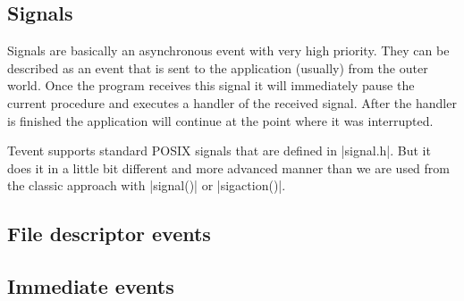 \subsection{Signals}

Signals are basically an asynchronous event with very high priority. They can be
described as an event that is sent to the application (usually) from the outer
world. Once the program receives this signal it will immediately pause the
current procedure and executes a handler of the received signal. After the
handler is finished the application will continue at the point where it was
interrupted.

Tevent supports standard POSIX signals that are defined in |signal.h|. But it
does it in a little bit different and more advanced manner than we are used
from the classic approach with |signal()| or |sigaction()|.

\subsection{File descriptor events}

\subsection{Immediate events}